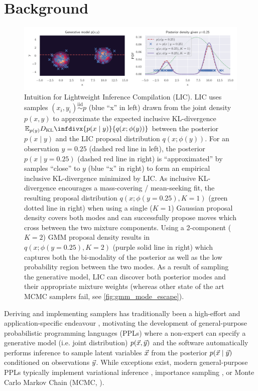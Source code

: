 \documentclass[twoside]{article}
\begin{document}
\section{Background}

\begin{figure}
  \centering
  \includegraphics[width=\linewidth]{Figures/intuition.pdf}
  \caption{
    Intuition for Lightweight Inference Compilation (LIC).
    LIC uses samples $(x_i, y_i) \overset{\text{iid}}{\sim} p$ (blue ``x'' in left)
    drawn from the joint density $p(x, y)$ to approximate the expected inclusive KL-divergence
    $\bE_{p(y)} D_{\text{KL}}\infdivx{p(x \mid y)}{q(x; \phi(y))}$
    between the posterior $p(x \mid y)$ and the LIC proposal distribution
    $q(x ; \phi(y))$. For an observation $y=0.25$ (dashed red line in left),
    the posterior $p(x \mid y=0.25)$ (dashed red line in right) is ``approximated''
    by samples ``close'' to $y$ (blue ``x'' in right) to form an empirical
    inclusive KL-divergence minimized by LIC. As inclusive KL-divergence
    encourages a mass-covering / mean-seeking fit, the resulting proposal
    distribution $q(x;\phi(y=0.25), K=1)$ (green dotted line in right)
    when using a single ($K=1$) Gaussian proposal density covers both modes
    and can successfully propose moves which cross between the two mixture
    components. Using a 2-component ($K=2$) GMM proposal density results in
    $q(x;\phi(y=0.25), K=2)$ (purple solid line in right) which captures both the
    bi-modality of the posterior as well as the low probability region between
    the two modes.
    As a result of sampling the generative model, LIC can discover
    both posterior modes and their appropriate mixture weights
    (whereas other state of the art MCMC samplers fail, see \cref{fig:gmm_mode_escape}).
  }\label{fig:intuition}
\end{figure}


Deriving and implementing samplers has traditionally been a high-effort and
application-specific endeavour \citep{porteous2008fast,murray2010elliptical},
motivating the development of general-purpose probabilistic programming
languages (PPLs) where a non-expert can specify a generative model (i.e.
joint distribution) $p(\vec{x}, \vec{y})$ and the software automatically performs
inference to sample latent variables $\vec{x}$ from the posterior $p(\vec{x} \mid
  \vec{y})$ conditioned on observations $\vec{y}$. While exceptions exist,
modern general-purpose PPLs typically implement variational inference
\citep{bingham2019pyro}, importance sampling
\citep{wood2014new,le2017inference}, or Monte Carlo Markov Chain (MCMC,
\cite{wingate2011lightweight,tehrani2020beanmachine}).
\end{document}
